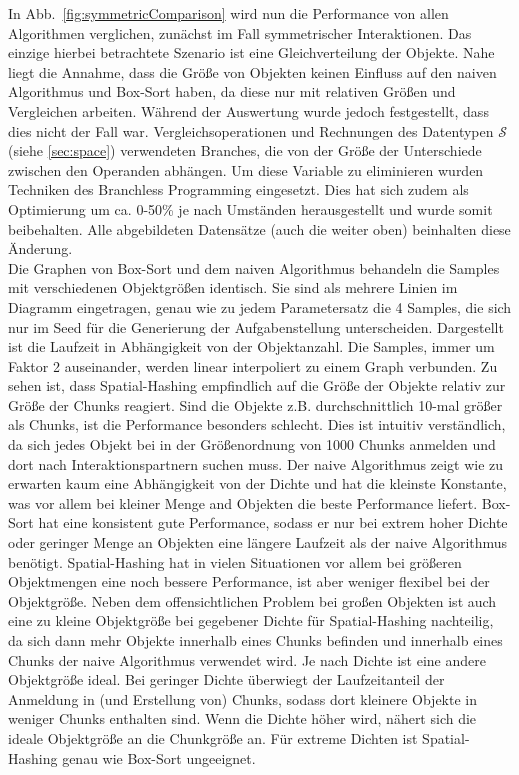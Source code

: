 In Abb.~\ref{fig:symmetricComparison} wird nun die Performance von allen Algorithmen verglichen, zunächst im Fall symmetrischer Interaktionen. Das einzige hierbei betrachtete Szenario ist eine Gleichverteilung der Objekte. Nahe liegt die Annahme, dass die Größe von Objekten keinen Einfluss auf den naiven Algorithmus und Box-Sort haben, da diese nur mit relativen Größen und Vergleichen arbeiten. Während der Auswertung wurde jedoch festgestellt, dass dies nicht der Fall war.
Vergleichsoperationen und Rechnungen des Datentypen $\mathcal{S}$ (siehe \ref{sec:space}) verwendeten Branches, die von der Größe der Unterschiede zwischen den Operanden abhängen. Um diese Variable zu eliminieren wurden Techniken des Branchless Programming eingesetzt. Dies hat sich zudem als Optimierung um ca. 0-50\% je nach Umständen herausgestellt und wurde somit beibehalten. Alle abgebildeten Datensätze (auch die weiter oben) beinhalten diese Änderung.\\
Die Graphen von Box-Sort und dem naiven Algorithmus behandeln die Samples mit verschiedenen Objektgrößen identisch. Sie sind als mehrere Linien im Diagramm eingetragen, genau wie zu jedem Parametersatz die 4 Samples, die sich nur im Seed für die Generierung der Aufgabenstellung unterscheiden. Dargestellt ist die Laufzeit in Abhängigkeit von der Objektanzahl. Die Samples, immer um Faktor 2 auseinander, werden linear interpoliert zu einem Graph verbunden. Zu sehen ist, dass Spatial-Hashing empfindlich auf die Größe der Objekte relativ zur Größe der Chunks reagiert. Sind die Objekte z.B. durchschnittlich 10-mal größer als Chunks, ist die Performance besonders schlecht. Dies ist intuitiv verständlich, da sich jedes Objekt bei in der Größenordnung von 1000 Chunks anmelden und dort nach Interaktionspartnern suchen muss. Der naive Algorithmus zeigt wie zu erwarten kaum eine Abhängigkeit von der Dichte und hat die kleinste Konstante, was vor allem bei kleiner Menge and Objekten die beste Performance liefert. Box-Sort hat eine konsistent gute Performance, sodass er nur bei extrem hoher Dichte oder geringer Menge an Objekten eine längere Laufzeit als der naive Algorithmus benötigt. Spatial-Hashing hat in vielen Situationen vor allem bei größeren Objektmengen eine noch bessere Performance, ist aber weniger flexibel bei der Objektgröße. Neben dem offensichtlichen Problem bei großen Objekten ist auch eine zu kleine Objektgröße bei gegebener Dichte für Spatial-Hashing nachteilig, da sich dann mehr Objekte innerhalb eines Chunks befinden und innerhalb eines Chunks der naive Algorithmus verwendet wird. Je nach Dichte ist eine andere Objektgröße ideal. Bei geringer Dichte überwiegt der Laufzeitanteil der Anmeldung in (und Erstellung von) Chunks, sodass dort kleinere Objekte in weniger Chunks enthalten sind. Wenn die Dichte höher wird, nähert sich die ideale Objektgröße an die Chunkgröße an. Für extreme Dichten ist Spatial-Hashing genau wie Box-Sort ungeeignet.\\


